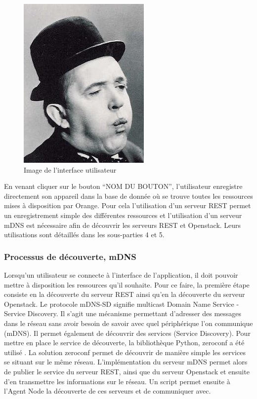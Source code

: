 \documentclass[twocolumn,a4paper]{IEEEtranfr}
\begin{document}
\begin{figure}[htpb]
  \begin{center}
    \includegraphics[width=0.7\columnwidth] {../images/SLaurel.jpg}
  \end{center}
  \caption{Image de l'interface utilisateur }
  \label{fig:agent_node}
\end{figure}

En venant cliquer sur le bouton “NOM DU BOUTON”, l’utilisateur enregistre directement son appareil dans la base de donnée où se trouve toutes les ressources mises à disposition  par Orange. Pour cela l’utilisation d’un serveur REST permet un enregistrement simple des différentes ressources et l’utilisation d’un serveur mDNS est nécessaire afin de découvrir les serveurs REST et Openstack. Leurs utilisations sont détaillés dans les sous-parties 4 et 5.

\subsubsection{Processus de découverte, mDNS}

Lorsqu’un utilisateur se connecte à l’interface de l’application, il doit pouvoir mettre à disposition les ressources qu’il souhaite. Pour ce faire, la première étape consiste en la découverte du serveur REST ainsi qu’en la découverte du serveur Openstack. Le protocole mDNS-SD signifie multicast Domain Name Service - Service Discovery. Il s’agit une mécanisme permettant d’adresser des messages dans le réseau sans avoir besoin de savoir avec quel périphérique l’on communique (mDNS). Il permet également de découvrir des services (Service Discovery). Pour mettre en place le service de découverte, la bibliothèque Python, zeroconf a été utilisé . La solution zeroconf permet de découvrir de manière simple les services se situant sur le même réseau. L’implémentation du serveur mDNS permet alors de publier le service du serveur REST, ainsi que du serveur Openstack et ensuite d’en transmettre les informations sur le réseau. Un script permet ensuite à l’Agent Node la découverte de ces serveurs et de communiquer avec.
\end{document}
